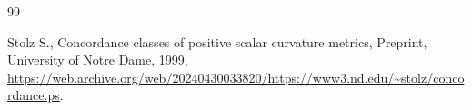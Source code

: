 \begin{thebibliography}{99}

Stolz S., Concordance classes of positive scalar curvature metrics, {P}reprint, University of Notre Dame, 1999, \url{https://web.archive.org/web/20240430033820/https://www3.nd.edu/~stolz/concordance.ps}.

\end{thebibliography}
